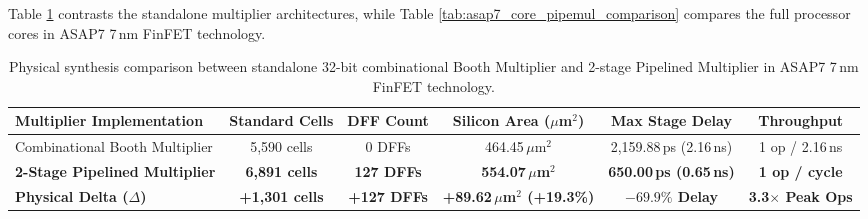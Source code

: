 Table \ref{tab:asap7_pipemul_synthesis} contrasts the standalone multiplier architectures, while Table \ref{tab:asap7_core_pipemul_comparison} compares the full processor cores in ASAP7 7\,nm FinFET technology.

\begin{table}[htbp]
\centering
\small
\begin{tabular}{|l|c|c|c|c|c|}
\hline
\textbf{Multiplier Implementation} & \textbf{Standard Cells} & \textbf{DFF Count} & \textbf{Silicon Area ($\mu$m$^2$)} & \textbf{Max Stage Delay} & \textbf{Throughput} \\
\hline
Combinational Booth Multiplier      & 5,590 cells            & 0 DFFs             & 464.45\,$\mu$m$^2$                & 2,159.88\,ps (2.16\,ns)  & 1 op / 2.16\,ns \\
\textbf{2-Stage Pipelined Multiplier}& \textbf{6,891 cells}   & \textbf{127 DFFs}  & \textbf{554.07\,$\mu$m$^2$}       & \textbf{650.00\,ps (0.65\,ns)} & \textbf{1 op / cycle} \\
\hline
\textbf{Physical Delta ($\Delta$)}  & \textbf{+1,301 cells}  & \textbf{+127 DFFs} & \textbf{+89.62\,$\mu$m$^2$ (+19.3\%)} & \textbf{$-69.9\%$ Delay} & \textbf{3.3$\times$ Peak Ops} \\
\hline
\end{tabular}
\caption{Physical synthesis comparison between standalone 32-bit combinational Booth Multiplier and 2-stage Pipelined Multiplier in ASAP7 7\,nm FinFET technology.}\label{tab:asap7_pipemul_synthesis}
\end{table}


